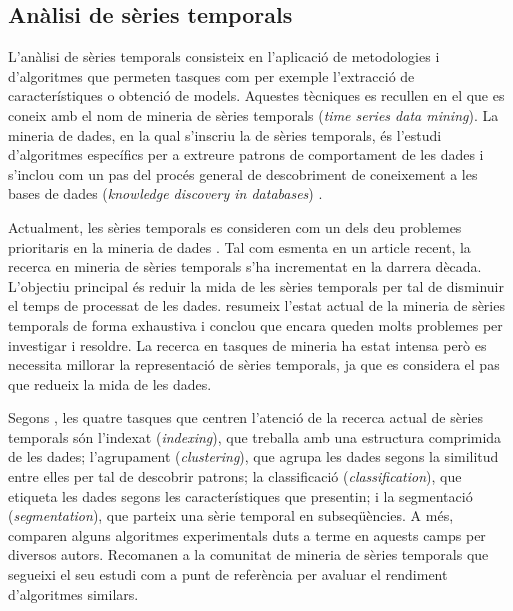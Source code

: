 \subsection{Anàlisi de sèries temporals}


L'anàlisi de sèries temporals consisteix en l'aplicació de
metodologies i d'algoritmes que permeten tasques com per exemple
l'extracció de característiques o obtenció de models.  Aquestes
tècniques es recullen en el que es coneix amb el nom de mineria de
sèries temporals (\emph{time series data mining}). La mineria de
dades, en la qual s'inscriu la de sèries temporals, és l'estudi
d'algoritmes específics per a extreure patrons de comportament de les
dades i s'inclou com un pas del procés general de descobriment de
coneixement a les bases de dades (\emph{knowledge discovery in
  databases}) \parencite{fayyad96,last01}.

Actualment, les sèries temporals es consideren com un dels deu problemes
prioritaris en la mineria de dades \parencite{yangwu06}. Tal com
esmenta \textcite{fu11} en un article recent, la recerca en mineria de
sèries temporals s'ha incrementat en la darrera dècada. L'objectiu
principal és reduir la mida de les sèries temporals per tal de
disminuir el temps de processat de les dades.  \citeauthor{fu11}
resumeix l'estat actual de la mineria de sèries temporals de forma
exhaustiva i conclou que encara queden molts problemes per investigar
i resoldre. La recerca en tasques de mineria ha estat intensa però es
necessita millorar la representació de sèries temporals, ja que es
considera el pas que redueix la mida de les dades.

Segons \textcite{keogh02}, les quatre tasques que centren l'atenció de
la recerca actual de sèries temporals són l'indexat (\emph{indexing}),
que treballa amb una estructura comprimida de les dades; l'agrupament
(\emph{clustering}), que agrupa les dades segons la similitud entre
elles per tal de descobrir patrons; la classificació
(\emph{classification}), que etiqueta les dades segons les
característiques que presentin; i la segmentació
(\emph{segmentation}), que parteix una sèrie temporal en
subseqüències.  A més, \citeauthor{keogh02} comparen alguns algoritmes
experimentals duts a terme en aquests camps per diversos
autors. Recomanen a la comunitat de mineria de sèries temporals que
segueixi el seu estudi com a punt de referència per avaluar el
rendiment d'algoritmes similars.

